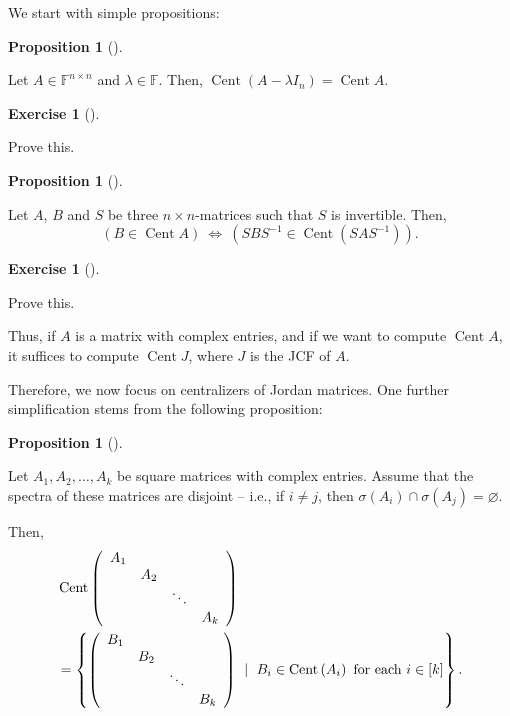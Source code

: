 \documentclass[numbers=enddot,12pt,final,onecolumn,notitlepage]{scrartcl}%
\newcounter{exer}
\numberwithin{exer}{subsection}
\theoremstyle{definition}
\newtheorem{prop}[theo]{Proposition}
\newenvironment{proposition}[1][]
{\begin{prop}[#1]\begin{leftbar}}
{\end{leftbar}\end{prop}}
\newtheorem{exmp}[exer]{Exercise}
\newenvironment{exercise}[1][]
{\begin{exmp}[#1]\begin{leftbar}}
{\end{leftbar}\end{exmp}}
\begin{document}
We start with simple propositions:

\begin{proposition}
\label{prop.jnf.cent.lambda}Let $A\in\mathbb{F}^{n\times n}$ and $\lambda
\in\mathbb{F}$. Then, $\operatorname*{Cent}\left(  A-\lambda I_{n}\right)
=\operatorname*{Cent}A$.
\end{proposition}

\begin{exercise}
 Prove this.
\end{exercise}

\begin{proposition}
\label{prop.jnf.cent.similar}Let $A$, $B$ and $S$ be three $n\times
n$-matrices such that $S$ is invertible. Then,
\[
\left(  B\in\operatorname*{Cent}A\right)  \ \Longleftrightarrow\ \left(
SBS^{-1}\in\operatorname*{Cent}\left(  SAS^{-1}\right)  \right)  .
\]

\end{proposition}

\begin{exercise}
 Prove this.
\end{exercise}

Thus, if $A$ is a matrix with complex entries, and if we want to compute
$\operatorname*{Cent}A$, it suffices to compute $\operatorname*{Cent}J$, where
$J$ is the JCF of $A$.

Therefore, we now focus on centralizers of Jordan matrices. One further
simplification stems from the following proposition:

\begin{proposition}
\label{prop.jnf.cent.block-separate}Let $A_{1},A_{2},\ldots,A_{k}$ be square
matrices with complex entries. Assume that the spectra of these matrices are
disjoint -- i.e., if $i\neq j$, then $\sigma\left(  A_{i}\right)  \cap
\sigma\left(  A_{j}\right)  =\varnothing$.

Then,%
\begin{align*}
&  \operatorname*{Cent}\left(
\begin{array}
[c]{cccc}%
A_{1} &  &  & \\
& A_{2} &  & \\
&  & \ddots & \\
&  &  & A_{k}%
\end{array}
\right) \\
&  =\left\{  \left(
\begin{array}
[c]{cccc}%
B_{1} &  &  & \\
& B_{2} &  & \\
&  & \ddots & \\
&  &  & B_{k}%
\end{array}
\right)  \ \mid\ B_{i}\in\operatorname*{Cent}\left(  A_{i}\right)  \text{ for
each }i\in\left[  k\right]  \right\}  .
\end{align*}

\end{proposition}
\end{document}
